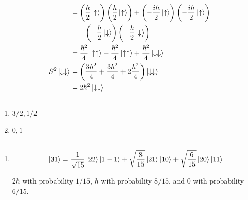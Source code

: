 \documentclass{article}
\begin{document}
\begin{enumerate}
\begin{align*}
                                                            & = \left( \frac{\hbar}{2} \ket{\uparrow} \right) \left( \frac{\hbar}{2} \ket{\uparrow} \right) + \left( -\frac{i \hbar}{2} \ket{\uparrow} \right) \left( -\frac{i \hbar}{2} \ket{\uparrow} \right)       \\
                                                            & \qquad \left( -\frac{\hbar}{2} \ket{\downarrow} \right) \left( -\frac{\hbar}{2} \ket{\downarrow} \right)                                                                                                \\
                                                            & = \frac{\hbar^2}{4} \ket{\uparrow \uparrow} - \frac{\hbar^2}{4} \ket{\uparrow \uparrow} + \frac{\hbar^2}{4} \ket{\downarrow \downarrow}                                                                 \\
          S^2 \ket{\downarrow \downarrow}                   & = \left( \frac{3 \hbar^2}{4} + \frac{3 \hbar^2}{4} + 2 \frac{\hbar^2}{4} \right) \ket{\downarrow \downarrow}                                                                                            \\
                                                            & = 2 \hbar^2 \ket{\downarrow \downarrow}
        \end{align*}
\end{enumerate}

\subsection{}

\begin{enumerate}
  \item $3 / 2, 1 / 2$

  \item $0, 1$
\end{enumerate}

\setcounter{subsection}{39}
\subsection{}

\begin{enumerate}
  \item \[\ket{3 1} = \frac{1}{\sqrt{15}} \ket{2 2} \ket{1 -1} + \sqrt{\frac{8}{15}} \ket{2 1} \ket{1 0} + \sqrt{\frac{6}{15}} \ket{2 0} \ket{1 1}\]

        $2 \hbar$ with probability $1 / 15$, $\hbar$ with probability $8 / 15$, and $0$ with probability $6 / 15$.
\end{enumerate}
\end{document}
